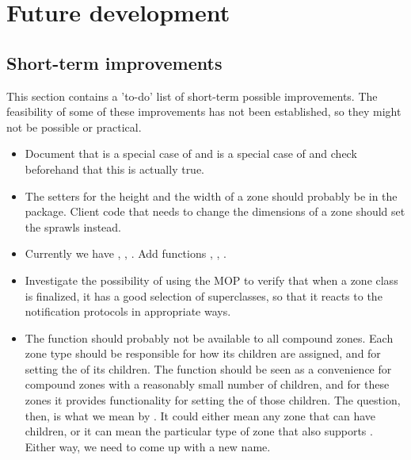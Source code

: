 \chapter{Future development}

\section{Short-term improvements}

This section contains a 'to-do' list of short-term possible
improvements.  The feasibility of some of these improvements has not
been established, so they might not be possible or practical. 

\begin{itemize}
\item Document that  is a special case of 
  and  is a  special case of  and check
  beforehand that this is actually true. 

\item The setters for the height and the width of a zone should
  probably be in the  package.  Client code that needs
  to change the dimensions of a zone should set the sprawls instead. 

\item Currently we have , ,
  .  Add functions 
  , ,
  .

\item Investigate the possibility of using the MOP to verify that when
  a zone class is finalized, it has a good selection of superclasses,
  so that it reacts to the notification protocols in appropriate ways.

\item The function  should probably not be
  available to all compound zones. Each zone type should be
  responsible for how its children are assigned, and for setting the
   of its children.  The function  should be seen as a convenience for compound
  zones with a reasonably small number of children, and for these
  zones it provides functionality for setting the  of
  those children.  The question, then, is what we mean by
  .  It could either mean any zone that can have
  children, or it can mean the particular type of zone that also
  supports .  Either way, we need to come
  up with a new name. 


\end{itemize}
